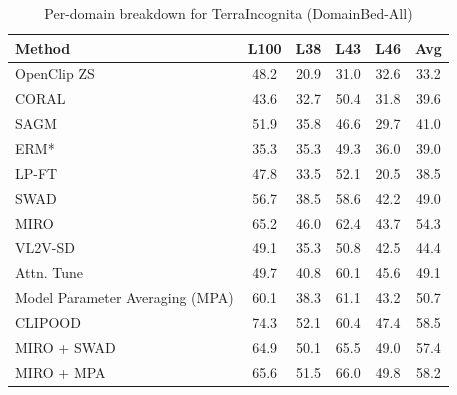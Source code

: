 \documentclass{article} %
\begin{document}
\begin{table}[t]
\small
\centering
\caption{Per-domain breakdown for TerraIncognita (DomainBed-All)}
\begin{tabular}{lccccc}
\toprule
\textbf{Method} & L100 & L38 & L43 & L46 & Avg \\ \midrule
OpenClip ZS & 48.2 & 20.9 & 31.0 & 32.6 & 33.2\\
\midrule
CORAL & 43.6 & 32.7 & 50.4 & 31.8 & 39.6 \\ 
SAGM & 51.9 & 35.8 & 46.6 & 29.7 & 41.0 \\ 
ERM* & 35.3 & 35.3 & 49.3 & 36.0 & 39.0 \\ 
LP-FT & 47.8 & 33.5 & 52.1 & 20.5 & 38.5 \\ 
SWAD & 56.7 & 38.5 & 58.6 & 42.2 & 49.0 \\ 
MIRO & 65.2 & 46.0 & 62.4 & 43.7 & 54.3 \\ 
VL2V-SD & 49.1 & 35.3 & 50.8 & 42.5 & 44.4 \\ 
Attn. Tune & 49.7 & 40.8 & 60.1 & 45.6 & 49.1 \\ 
Model Parameter Averaging (MPA) & 60.1 & 38.3 & 61.1 & 43.2 & 50.7 \\ 
CLIPOOD & 74.3   & 52.1 &  60.4  &  47.4  & 58.5 \\
\midrule
MIRO + SWAD & 64.9 & 50.1 & 65.5 & 49.0 & 57.4 \\ 
MIRO + MPA & 65.6 & 51.5 & 66.0 & 49.8 & 58.2 \\ 
\bottomrule
\end{tabular}
\label{table:TerraIncognita overall}
\end{table}
\end{document}
